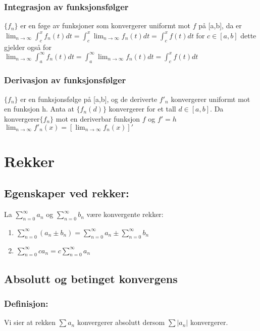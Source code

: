 \documentclass[8pt,a4paper,twocolumn,twoside]{article}
\def\abs#1{\lvert #1 \rvert}
\begin{document}
            \subsubsection*{Integrasjon av funksjonsfølger}
            $\{f_n\}$ er en føge av funksjoner som konvergerer uniformt mot $f$ på [a,b], da er $\lim_{n\to\infty}\int_c^x f_n(t)dt = \int_c^x\lim_{n\to\infty}f_n(t)dt=\int_c^xf(t)dt$
            for $c \in [a,b]$ dette gjelder også for\\ $\lim_{n\to\infty}\int_a^\infty f_n(t)dt = \int_a^\infty\lim_{n\to\infty}f_n(t)dt=\int_c^xf(t)dt$
            \subsubsection*{Derivasjon av funksjonsfølger}
            $\{f_n\}$ er en funksjonsfølge på [a,b], og de deriverte $f'_n$ konvergerer uniformt mot en funksjon h. Anta 
            at $\{f_n(d)\}$ konvergerer for et tall $d\in [a,b]$. Da konvergerer$\{f_n\}$ mot en deriverbar funksjon $f$ og $f'=h$\\
            $\lim_{n\to\infty}f'_n(x)=[\lim_{n\to\infty}f_n(x)]'$
            
    \section*{Rekker}
        \subsection*{Egenskaper ved rekker:}
        La $\sum_{n=0}^\infty a_n$ og $\sum_{n=0}^\infty b_n$ være konvergente rekker:
        \begin{enumerate}[topsep = 0pt,partopsep = 0pt, itemsep = 0cm]
            \item $\sum_{n=0}^\infty (a_n \pm b_n) = \sum_{n=0}^\infty a_n \pm \sum_{n=0}^\infty b_n$
            \item $\sum_{n=0}^\infty ca_n=c\sum_{n=0}^\infty a_n$
        \end{enumerate}
        \subsection*{Absolutt og betinget konvergens}
        \subsubsection*{Definisjon:}
        Vi sier at rekken $\sum a_n$ konvergerer absolutt dersom $\sum\abs{a_n}$ konvergerer.
\end{document}
